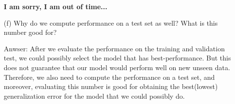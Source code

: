\documentclass[12pt,letterpaper]{article}
\begin{document}
\begin{itemize}
    \textbf{I am sorry, I am out of time...}
    
    \item[(f)]Why do we compute performance on a test set as well? What is this number good for?
    
    Anwser: After we evaluate the performance on the training and validation test, we could possibly select the model that has best-performance. But this does not guarantee that our model would perform well on new unseen data. Therefore, we also need to compute the performance on a test set, and moreover, evaluating this number is good for obtaining the best(lowest) generalization error for the model that we could possibly do.
\end{itemize}
\end{document}
